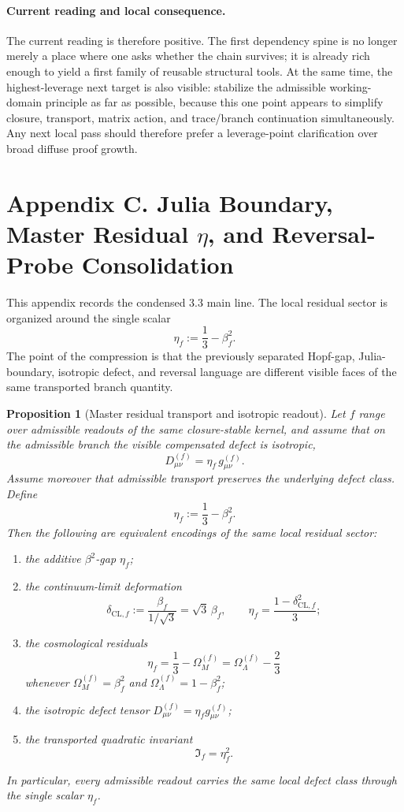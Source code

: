 \documentclass[12pt,a4paper]{article}
\newtheorem{proposition}[theorem]{Proposition}
\begin{document}
\paragraph{Current reading and local consequence.}
The current reading is therefore positive. The first dependency spine is no longer merely a place where one asks whether the chain survives; it is already rich enough to yield a first family of reusable structural tools. At the same time, the highest-leverage next target is also visible: stabilize the admissible working-domain principle as far as possible, because this one point appears to simplify closure, transport, matrix action, and trace/branch continuation simultaneously. Any next local pass should therefore prefer a leverage-point clarification over broad diffuse proof growth.



\section*{Appendix C. Julia Boundary, Master Residual $\eta$, and Reversal-Probe Consolidation}

This appendix records the condensed 3.3 main line. The local residual sector is organized around the single scalar
\[
 \eta_f:=\frac13-\beta_f^2.
\]
The point of the compression is that the previously separated Hopf-gap, Julia-boundary, isotropic defect, and reversal language are different visible faces of the same transported branch quantity.

\begin{proposition}[Master residual transport and isotropic readout]
\label{lem:defect-transport}
\label{prop:master-defect-scalar}
Let $f$ range over admissible readouts of the same closure-stable kernel, and assume that on the admissible branch the visible compensated defect is isotropic,
\[
 D^{(f)}_{\mu\nu}=\eta_f\,g^{(f)}_{\mu\nu}.
\]
Assume moreover that admissible transport preserves the underlying defect class. Define
\[
 \eta_f:=\frac13-\beta_f^2.
\]
Then the following are equivalent encodings of the same local residual sector:
\begin{enumerate}[label=(\roman*)]
 \item the additive $\beta^2$-gap $\eta_f$;
 \item the continuum-limit deformation
 \[
 \delta_{\mathrm{CL},f}:=\frac{\beta_f}{1/\sqrt3}=\sqrt3\,\beta_f,
 \qquad
 \eta_f=\frac{1-\delta_{\mathrm{CL},f}^2}{3};
 \]
 \item the cosmological residuals
 \[
 \eta_f=\frac13-\Omega_M^{(f)}=\Omega_\Lambda^{(f)}-\frac23
 \]
 whenever $\Omega_M^{(f)}=\beta_f^2$ and $\Omega_\Lambda^{(f)}=1-\beta_f^2$;
 \item the isotropic defect tensor $D^{(f)}_{\mu\nu}=\eta_f g^{(f)}_{\mu\nu}$;
 \item the transported quadratic invariant
 \[
 \mathfrak I_f=\eta_f^2.
 \]
\end{enumerate}
In particular, every admissible readout carries the same local defect class through the single scalar $\eta_f$.
\end{proposition}
\end{document}
